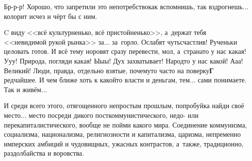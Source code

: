 Бр-р-р! Хорошо, что запретили это непотребство\mdash как вспомнишь, так вздрогнешь$\ldots$ колорит исчез и чёрт бы с ним.



C виду <<всё культурненько, всё пристойненько>>, а~держат тебя <<невидимой рукой рынка>> за$\ldots$ за~горло. Ослабят чуть\mdash счастлив! Рученьки целовать готов. 
И всё тему норовят сразу перевести, мол, а~страна\sdash то у нас какая! У\sdash у\sdash у! Природа, погляди какая! Ы\sdash ы\sdash ы! Дух захватывает! Народ\sdash то у нас какой! А\sdash а\sdash а! Великий! Люди, правда, отдельно взятые, почему\sdash то часто на поверку\mdash \textbf{Г} редчайшее. И чем ближе хоть к какой\sdash то власти и деньгам, тем$\ldots$ сами понимаете. Так и живём$\ldots$

И среди всего этого, отягощенного непростым прошлым, попробуй\sdash ка найди своё место$\ldots$ место посреди дикого посткоммунистического, недо- или пере\sdash  капиталистического, вообще не пойми какого мира. 
Соединение коммунизма, социализма, национализма, религиозности и капитализма, царизма, непременно имперских амбиций и чудовищных, ужасных контрастов, а~также, традиционно, раздолбайства и воровства. 

